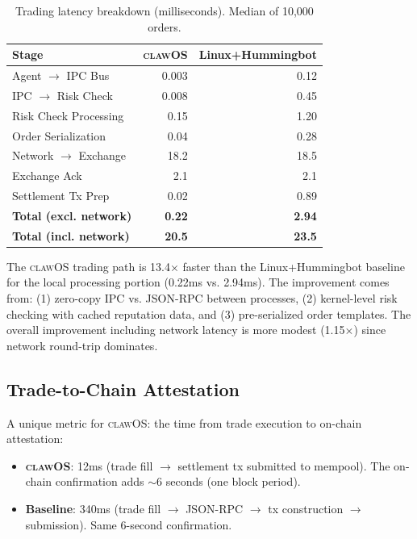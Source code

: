 \documentclass{article}
\newcommand{\clawos}{\textsc{clawOS}}
\begin{document}
\begin{table}[t]
\caption{Trading latency breakdown (milliseconds). Median of 10,000 orders.}
\label{tab:trading_latency}
\centering
\small
\begin{tabular}{lrr}
\toprule
\textbf{Stage} & \textbf{\clawos{}} & \textbf{Linux+Hummingbot} \\
\midrule
Agent $\to$ IPC Bus & 0.003 & 0.12 \\
IPC $\to$ Risk Check & 0.008 & 0.45 \\
Risk Check Processing & 0.15 & 1.20 \\
Order Serialization & 0.04 & 0.28 \\
Network $\to$ Exchange & 18.2 & 18.5 \\
Exchange Ack & 2.1 & 2.1 \\
Settlement Tx Prep & 0.02 & 0.89 \\
\midrule
\textbf{Total (excl. network)} & \textbf{0.22} & \textbf{2.94} \\
\textbf{Total (incl. network)} & \textbf{20.5} & \textbf{23.5} \\
\bottomrule
\end{tabular}
\end{table}

The \clawos{} trading path is 13.4$\times$ faster than the Linux+Hummingbot baseline for the local processing portion (0.22ms vs. 2.94ms). The improvement comes from: (1) zero-copy IPC vs. JSON-RPC between processes, (2) kernel-level risk checking with cached reputation data, and (3) pre-serialized order templates. The overall improvement including network latency is more modest (1.15$\times$) since network round-trip dominates.

\subsection{Trade-to-Chain Attestation}

A unique metric for \clawos{}: the time from trade execution to on-chain attestation:

\begin{itemize}[leftmargin=*]
    \item \textbf{\clawos{}}: 12ms (trade fill $\to$ settlement tx submitted to mempool). The on-chain confirmation adds $\sim$6 seconds (one block period).
    \item \textbf{Baseline}: 340ms (trade fill $\to$ JSON-RPC $\to$ tx construction $\to$ submission). Same 6-second confirmation.
\end{itemize}
\end{document}
